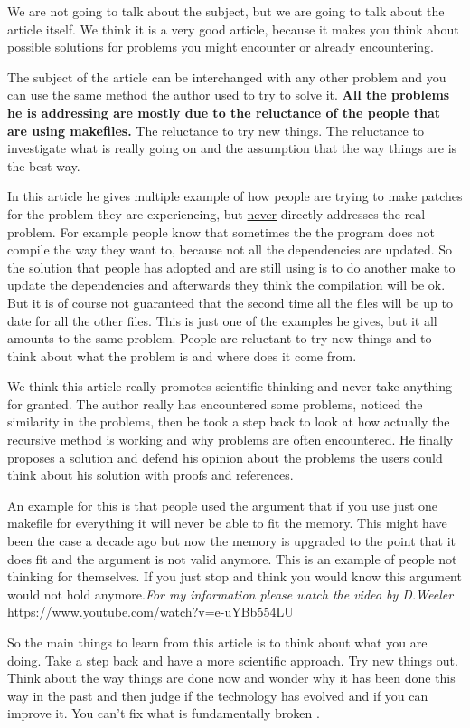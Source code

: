 

We are not going to talk about the subject, but we are going to talk about the article itself. We think it is a very good article, because it makes you think about possible solutions for problems you might encounter or already encountering.

The subject of the article can be interchanged with any other problem and you can use the same method the author used to try to solve it.
\textbf{All the problems he is addressing are mostly due to the reluctance of the people that are using makefiles.} The reluctance to try new things. The reluctance to investigate what is really going on and the assumption that the way things are is the best way.

In this article he gives multiple example of how people are trying to make patches for the problem they are experiencing, but \underline{never} directly addresses the real problem. For example people know that sometimes the the program does not compile the way they want to, because not all the dependencies are updated. So the solution that people has adopted and are still using is to do another make to update the dependencies and afterwards they think the compilation will be ok. But it is of course not guaranteed that the second time all the files will be up to date for all the other files. This is just one of the examples he gives, but it all amounts to the same problem. People are reluctant to try new things and to think about what the problem is and where does it come from. \cite{recursivemake}

We think this article really promotes scientific thinking and never take anything for granted. The author really has encountered some problems, noticed the similarity in the problems, then he took a step back to look at how actually the recursive method is working and why problems are often encountered. He finally proposes a solution and defend his opinion about the problems the users could think about his solution with proofs and references.

An example for this is that people used the argument that if you use just one makefile for everything it will never be able to fit the memory. This might have been the case a decade ago but now the memory is upgraded to the point that it does fit and the argument is not valid anymore. This is an example of people not thinking for themselves. If you just stop and think you would know this argument would not hold anymore.\textit{For my information please watch the video by D.Weeler}
\url{https://www.youtube.com/watch?v=e-uYBb554LU}

So the main things to learn from this article is to think about what you are doing. Take a step back and have a more scientific approach. Try new things out. Think about the way things are done now and wonder why it has been done this way in the past and then judge if the technology has evolved and if you can improve it. You can't fix what is fundamentally broken  .


